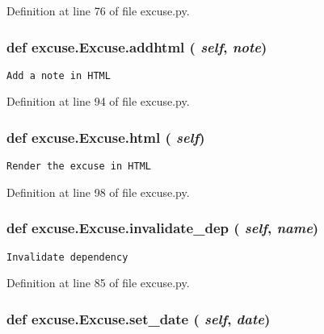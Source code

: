 Definition at line 76 of file excuse.py.
\subsubsection{\setlength{\rightskip}{0pt plus 5cm}def excuse.Excuse.addhtml ( {\em self},  {\em note})}\label{classexcuse_1_1Excuse_eb0a1ea0fae66a571e5efa703e53ba3a}




\footnotesize\begin{verbatim}Add a note in HTML\end{verbatim}
\normalsize
 

Definition at line 94 of file excuse.py.
\subsubsection{\setlength{\rightskip}{0pt plus 5cm}def excuse.Excuse.html ( {\em self})}\label{classexcuse_1_1Excuse_84049740652a58b248fabdb3fa9d4b2c}




\footnotesize\begin{verbatim}Render the excuse in HTML\end{verbatim}
\normalsize
 

Definition at line 98 of file excuse.py.
\subsubsection{\setlength{\rightskip}{0pt plus 5cm}def excuse.Excuse.invalidate\_\-dep ( {\em self},  {\em name})}\label{classexcuse_1_1Excuse_8594c46ccf4182fa8b37fe487bf53850}




\footnotesize\begin{verbatim}Invalidate dependency\end{verbatim}
\normalsize
 

Definition at line 85 of file excuse.py.
\subsubsection{\setlength{\rightskip}{0pt plus 5cm}def excuse.Excuse.set\_\-date ( {\em self},  {\em date})}\label{classexcuse_1_1Excuse_ac01c3b9802ad26571f01b55ffc1098c}




